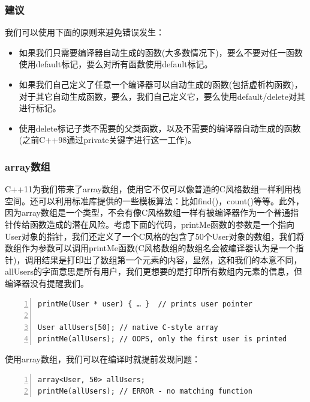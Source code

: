 \documentclass{ctexart}
\begin{document}
\subsubsection*{建议}

我们可以使用下面的原则来避免错误发生：

\begin{itemize}
	\item 如果我们只需要编译器自动生成的函数(大多数情况下)，要么不要对任一函数使用default标记，要么对所有函数使用default标记。
	\item 如果我们自己定义了任意一个编译器可以自动生成的函数(包括虚析构函数)，对于其它自动生成函数，要么，我们自己定义它，要么使用default/delete对其进行标记。
	\item 使用delete标记子类不需要的父类函数，以及不需要的编译器自动生成的函数(之前C++98通过private关键字进行这一工作)。
\end{itemize}

\subsubsection{array数组}

C++11为我们带来了array数组，使用它不仅可以像普通的C风格数组一样利用栈空间。还可以利用标准库提供的一些模板算法：比如find()，count()等等。此外，因为array数组是一个类型，不会有像C风格数组一样有被编译器作为一个普通指针传给函数造成的潜在风险。考虑下面的代码，printMe函数的参数是一个指向User对象的指针，我们还定义了一个C风格的包含了50个User对象的数组，我们将数组作为参数可以调用printMe函数(C风格数组的数组名会被编译器认为是一个指针)，调用结果是打印出了数组第一个元素的内容，显然，这和我们的本意不同，allUsers的字面意思是所有用户，我们更想要的是打印所有数组内元素的信息，但编译器没有提醒我们。

\begin{lstlisting}[language={[ANSI]C},keywordstyle=\color{blue!70},commentstyle=\color{red!50!green!50!blue!50},frame=shadowbox, rulesepcolor=\color{red!20!green!20!blue!20},basicstyle=\small,numbers=left, numberstyle=\tiny,breaklines=true]
printMe(User * user) { … }  // prints user pointer

User allUsers[50]; // native C-style array  
printMe(allUsers); // OOPS, only the first user is printed
\end{lstlisting}

使用array数组，我们可以在编译时就提前发现问题：

\begin{lstlisting}[language={[ANSI]C},keywordstyle=\color{blue!70},commentstyle=\color{red!50!green!50!blue!50},frame=shadowbox, rulesepcolor=\color{red!20!green!20!blue!20},basicstyle=\small,numbers=left, numberstyle=\tiny,breaklines=true]
array<User, 50> allUsers;  
printMe(allUsers); // ERROR - no matching function
\end{lstlisting}
\end{document}
